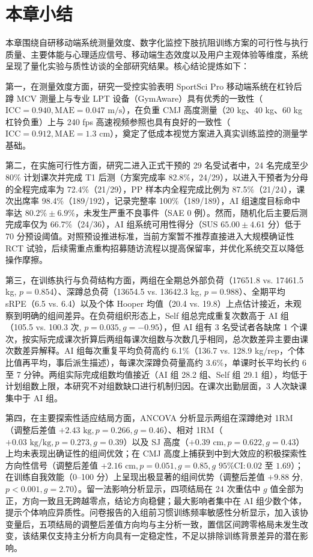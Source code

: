 \documentclass[UTF8,zihao=-4,twoside,openany]{ctexbook}
\begin{document}
\section{本章小结}
本章围绕自研移动端系统测量效度、数字化监控下肢抗阻训练方案的可行性与执行质量、主要体能与心理适应信号、移动端生态效度以及用户主观体验等维度，系统呈现了量化实验与质性访谈的全部研究结果。核心结论提炼如下：

第一，在测量效度方面，研究一受控实验表明 SportSci Pro 移动端系统在杠铃后蹲 MCV 测量上与专业 LPT 设备（GymAware）具有优秀的一致性（$\text{ICC}=0.940, \text{MAE}=0.047\text{ m/s}$），在负重 CMJ 高度测量（20 kg、40 kg、60 kg 杠铃负重）上与 240 fps 高速视频参照也具有良好的一致性（$\text{ICC}=0.912, \text{MAE}=1.3\text{ cm}$），奠定了低成本视觉方案进入真实训练监控的测量学基础。

第二，在实施可行性方面，研究二进入正式干预的 29 名受试者中，24 名完成至少 80\% 计划课次并完成 T1 后测（方案完成率 82.8\%，24/29），以进入干预者为分母的全程完成率为 72.4\%（21/29），PP 样本内全程完成比例为 87.5\%（21/24），课次出席率 98.4\%（189/192），记录完整率 100\%（189/189），AI 组速度目标命中率达 $80.2\% \pm 6.9\%$，未发生严重不良事件（SAE 0 例）。然而，随机化后主要后测完成率仅为 66.7\%（24/36），AI 组系统可用性得分（SUS $65.00 \pm 4.61$ 分）低于 70 分预设阈值。对照预设推进标准，当前方案暂不推荐直接进入大规模确证性 RCT 试验，后续需重点重构招募随访流程以提高保留率，并优化系统交互以降低操作摩擦。

第三，在训练执行与负荷结构方面，两组在全期总外部负荷（17651.8 vs. 17461.5 kg, $p=0.854$）、深蹲总负荷（13654.5 vs. 13642.3 kg, $p=0.988$）、全期平均 sRPE（6.5 vs. 6.4）以及个体 Hooper 均值（20.4 vs. 19.8）上点估计接近，未观察到明确的组间差异。在负荷组织形态上，Self 组总完成重复次数高于 AI 组（105.5 vs. 100.3 次, $p=0.035, g=-0.95$），但 AI 组有 3 名受试者各缺席 1 个课次，按实际完成课次折算后两组每课次组数与次数几乎相同，总次数差异主要由课次数差异解释。AI 组每次重复平均负荷高约 6.1\%（136.7 vs. 128.9 kg/rep，个体比值再平均，事后派生描述），每课次深蹲负荷量高约 3.6\%，单课时长平均长约 6 至 7 分钟。两组实际完成组数均值接近（AI 组 28.2 组、Self 组 29.1 组），均低于计划组数上限，本研究不对组数缺口进行机制归因。在课次出勤层面，3 人次缺课集中于 AI 组。

第四，在主要探索性适应结局方面，ANCOVA 分析显示两组在深蹲绝对 1RM（调整后差值 $+2.43\text{ kg}, p=0.266, g=0.46$）、相对 1RM（$+0.03\text{ kg/kg}, p=0.273, g=0.39$）以及 SJ 高度（$+0.39\text{ cm}, p=0.622, g=0.43$）上均未表现出确证性的组间优效；在 CMJ 高度上捕获到中到大效应的积极探索性方向性信号（调整后差值 $+2.16\text{ cm}, p=0.051, g=0.85, g\text{ 95\% CI}: 0.02\text{ 至 }1.69$）；在训练自我效能（0--100 分）上呈现出极显著的组间优势（调整后差值 $+9.88$ 分, $p<0.001, g=2.70$）。留一法影响分析显示，四项结局在 24 次重估中 $g$ 值全部为正，方向一致且无跨越零点，结论方向稳健；最大影响者集中在 AI 组少数个体，提示个体响应异质性。问卷报告的入组前习惯训练频率敏感性分析显示，加入该协变量后，五项结局的调整后差值方向均与主分析一致，置信区间跨零格局未发生改变，该结果仅支持主分析方向具有一定稳定性，不足以排除训练背景差异的潜在影响。
\end{document}
